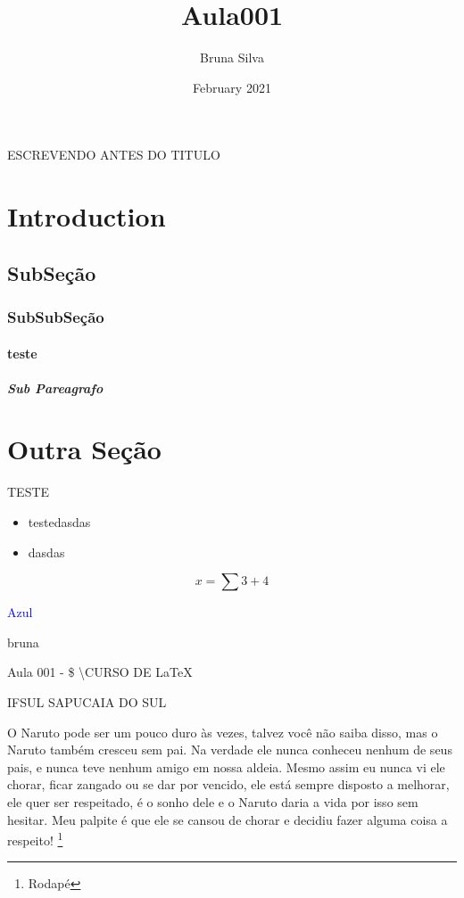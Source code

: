 \documentclass{article}
\title{Aula001}
\author{Bruna Silva}
\date{February 2021}
\begin{document}
ESCREVENDO ANTES DO TITULO

\maketitle

\section{Introduction}
\subsection{SubSeção}
\subsubsection{SubSubSeção}

\paragraph{teste}

\subparagraph{Sub Pareagrafo}
\section{Outra Seção}
TESTE

\begin{itemize}
    \item testedasdas
    \item dasdas
\end{itemize}

\begin{equation}
    x = \sum{3+4}
\end{equation}

\textcolor{blue}{Azul}

\textcolor{minhacor}{bruna}

Aula 001 - \$ \textbackslash CURSO DE \LaTeX

IFSUL SAPUCAIA DO SUL

O Naruto pode ser um pouco duro às vezes, talvez você não saiba disso, mas o Naruto também cresceu sem pai. Na verdade ele nunca conheceu nenhum de seus pais, e nunca teve nenhum amigo em nossa aldeia. Mesmo assim eu nunca vi ele chorar, ficar zangado ou se dar por vencido, ele está sempre disposto a melhorar, ele quer ser respeitado, é o sonho dele e o Naruto daria a vida por isso sem hesitar. Meu palpite é que ele se cansou de chorar e decidiu fazer alguma coisa a respeito!
\footnote{Rodapé}
\end{document}
